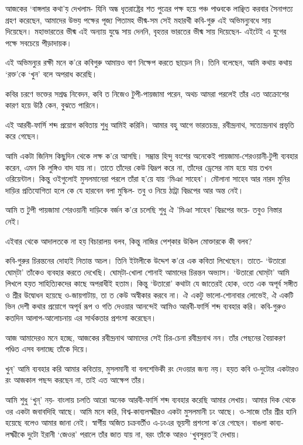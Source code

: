 \documentclass[a4paper,11pt]{article}
\begin{document}
\begin{multicols}{3}
{\begin{spacing}{1.15}
আজকের ‘বাঙ্গলার কথা’য় দেখলাম- যিনি অন্ধ ধৃতরাষ্ট্রের শত পুত্রের পক্ষ হয়ে পঞ্চ পাণ্ডবকে লাঞ্ছিত করবার সৈনাপত্য গ্রহণ করেছেন, আমাদের উভয় পক্ষের পূজ্য পিতামহ ভীষ্ম-সম সেই মহারথী কবি-গুরু এই অভিমন্যুবধে সায় দিয়েছেন। মহাভারতের ভীষ্ম এই অন্যায় যুদ্ধে সায় দেননি, বৃহত্তর ভারতের ভীষ্ম সায় দিয়েছেন- এইটেই এ যুগের পক্ষে সবচেয়ে পীড়াদায়ক।

এই অভিমন্যুর রক্ষী মনে ক’রে কবিগুরু আমায়ও বাণ নিক্ষেপ করতে ছাড়েন নি। তিনি বলেছেন, আমি কথায় কথায় ‘রক্ত’কে ‘খুন’ বলে অপরাধ করেছি।

কবির চরণে ভক্তের সশ্রদ্ধ নিবেদন, কবি ত নিজেও টুপী-পায়জামা পরেন, অথচ আমরা পরলেই তাঁর এত আক্রোশের কারণ হয়ে উঠি কেন, বুঝতে পারিনে।

এই আরবী-ফার্সি শব্দ প্রয়োগ কবিতায় শুধু আমিই করিনি। আমার বহু আগে ভারতচন্দ্র, রবীন্দ্রনাথ, সত্যেন্দ্রনাথ প্রভৃতি করে গেছেন।

আমি একটা জিনিস কিছুদিন থেকে লক্ষ ক’রে আসছি। সম্ভ্রান্ত হিন্দু বংশের অনেকেই পায়জামা-শেরওয়ানী-টুপী ব্যবহার করেন, এমন কি লুঙ্গিও বাদ যায় না। তাতে তাঁদের কেউ বিদ্রূপ করে না, তাঁদের ড্রেসের নাম হয়ে যায় তখন ওরিয়েন্টাল। কিন্তু ওইগুলোই মুসলমানেরা পরলে তাঁরা হ’য়ে যায় ‘মিঞা সাহেব’। মৌলানা সাহেব আর নারদ মুনির দাড়ির প্রতিযোগিতা হলে কে যে হারবেন বলা মুস্কিল- তবু ও নিয়ে ঠাট্রা বিদ্রূপের আর অন্ত নেই।

আমি ত টুপী পায়জামা শেরওয়ানী দাড়িকে বর্জন ক’রে চলেছি শুধু ঐ 'মিঞা সাহেব’ বিদ্রূপের ভয়ে- তবুও নিস্তার নেই।

এইবার থেকে আদালতকে না হয় বিচারালয় বলব, কিন্তু নাজির পেশ্‌কার উকিল মোক্তারকে কী বলব?

কবি-গুরুর চিরন্তনের দোহাই নিতান্ত অচল। তিনি ইটালীকে উদ্দেশ ক’রে এক কবিতা লিখেছেন। তাতে- ‘উতারো ঘোম্‌টা’ তাঁকেও ব্যবহার করতে দেখেছি। ঘোম্‌টা-খোলা শোনাই আমাদের চিরন্তন অভ্যাস। ‘উতারো ঘোম্‌টা’ আমি লিখলে হয়ত সাহিত্যিকদের কাছে অপরাধীই হতাম। কিন্তু ‘উতারো’ কথাটা যে জাতেরই হোক, ওতে এক অপূর্ব সঙ্গীত ও শ্রীর উদ্বোধন হয়েছে ও-জায়গাটায়, তা ত কেউ অস্বীকার করবে না। ঐ একটু ভালো-শোনাবার লোভেই, ঐ একটি ভিন দেশী কথার প্রয়োগে অপূর্ব রূপ ও গতি দেওয়ার আনন্দেই আমিও আরবী-ফার্সি শব্দ ব্যবহার করি। কবি-গুরুও কতদিন আলাপ-আলোচনায় এর সার্থকতার প্রশংসা করেছেন।

আজ আমাদেরও মনে হচ্ছে, আজকের রবীন্দ্রনাথ আমাদের সেই চির-চেনা রবীন্দ্রনাথ নন। তাঁর পেছনের বৈয়াকরণ পণ্ডিত এসব বলাচ্ছে তাঁকে দিয়ে।

খুন্‌’ আমি ব্যবহার করি আমার কবিতায়, মুসলমানী বা বলশেভিকী রং দেওয়ার জন্য নয়। হয়ত কবি ও-দুটোর একটারও রং আজকাল পছন্দ করছেন না, তাই এত আক্ষেপ তাঁর।

    আমি শুধু ‘খুন্‌’ নয়- বাংলায় চলতি আরো অনেক আরবী-ফার্সি শব্দ ব্যবহার করেছি আমার লেখায়। আমার দিক থেকে ওর একটা জবাবদিহি আছে। আমি মনে করি, বিশ্ব-কাব্যলক্ষ্মীরও একটা মুসলমানী ঢং আছে। ও-সাজে তাঁর শ্রীর হানি হয়েছে বলেও আমার জানা নেই। স্বার্গীয় অজিত চক্রবর্তীও এ-ঢংএর ভূয়সী প্রশংসা ক’রে গেছেন। বাঙলা কাব্য-লক্ষ্মীকে দুটো ইরানী ‘জেওর’ পরালে তাঁর জাত যায় না, বরং তাঁকে আরও ‘খুবসুরত’ই দেখায়।


\end{spacing}}
\end{multicols}
\end{document}
